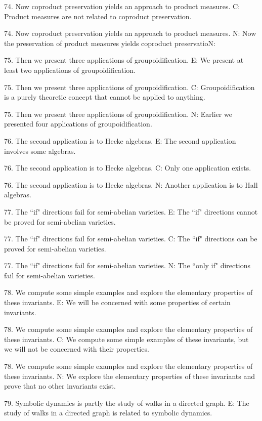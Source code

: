 74. Now coproduct preservation yields an approach to product measures.
C: Product measures are not related to coproduct preservation.

74. Now coproduct preservation yields an approach to product measures.
N: Now the preservation of product measures yields coproduct preservatioN: 

75. Then we present three applications of groupoidification.
E: We present at least two applications of groupoidification.

75. Then we present three applications of groupoidification.
C: Groupoidification is a purely theoretic concept that cannot be applied to anything.

75. Then we present three applications of groupoidification.
N: Earlier we presented four applications of groupoidification.

76. The second application is to Hecke algebras.
E: The second application involves some algebras.

76. The second application is to Hecke algebras.
C: Only one application exists.

76. The second application is to Hecke algebras.
N: Another application is to Hall algebras.

77. The ``if" directions fail for semi-abelian varieties.
E: The ``if" directions cannot be proved for semi-abelian varieties.

77. The ``if" directions fail for semi-abelian varieties.
C: The ``if" directions can be proved for semi-abelian varieties.

77. The ``if" directions fail for semi-abelian varieties.
N: The ``only if" directions fail for semi-abelian varieties.

78. We compute some simple examples and explore the elementary properties of these invariants.
E: We will be concerned with some properties of certain invariants.

78. We compute some simple examples and explore the elementary properties of these invariants.
C: We compute some simple examples of these invariants, but we will not be concerned with their properties.

78. We compute some simple examples and explore the elementary properties of these invariants.
N: We explore the elementary properties of these invariants and prove that no other invariants exist.

79. Symbolic dynamics is partly the study of walks in a directed graph.
E: The study of walks in a directed graph is related to symbolic dynamics.

